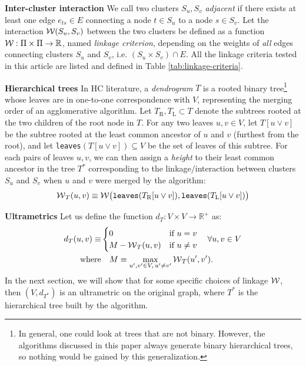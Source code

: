 \textbf{Inter-cluster interaction } We call two clusters $S_u,S_v$ \emph{adjacent} if there exists at least one edge ${e_{ts}\in E}$ connecting a node $t\in S_u$ to a node $s\in S_v$. Let the interaction $\mathcal{W}(S_u,S_v)$ between the two clusters be defined as a function $\mathcal{W}{}:\Pi \times \Pi \rightarrow \mathbb{R}$,  named \emph{linkage criterion}, depending on the weights of \emph{all} edges connecting clusters $S_u$ and $S_v$, i.e. $(S_u \times S_v) \cap E$. 
All the linkage criteria tested in this article are listed and defined in Table \ref{tab:linkage-criteria}.

\textbf{Hierarchical trees} In HC literature, a \emph{dendrogram} $T$ is a rooted binary tree\footnote{In general, one could look at trees that are not binary. However, the algorithms discussed in this paper always generate binary hierarchical trees, so nothing would be gained by this generalization.} whose leaves are in one-to-one correspondence with $V$, representing the merging order of an agglomerative algorithm.
Let $T_{\mathrm{R}},T_{\mathrm{L}}\subset T$ denote the subtrees rooted at the two children of the root node in $T$.
For any two leaves $u,v \in V$, let $T[u \vee v]$ be the subtree rooted at the least common ancestor of $u$ and $v$ (furthest from the root), and let \texttt{leaves}$(T[u \vee v])\subseteq V$ be the set of leaves of this subtree. 
For each pairs of leaves $u,v$, we can then assign a \emph{height} to their least common ancestor in the tree $T^*$ corresponding to the linkage/interaction between clusters $S_u$ and $S_v$ when $u$ and $v$ were merged by the algorithm:
\begin{equation}
\mathcal{W}{}_{T}(u,v) \equiv \mathcal{W}{} \big( \text{\texttt{leaves}}(T_{\mathrm{R}}[u \vee v]), \text{\texttt{leaves}}(T_{\mathrm{L}}[u \vee v]) \big)
\end{equation}


\textbf{Ultrametrics}  Let us define the function $d_T: V \times V \rightarrow \mathbb{R}^{+}$ as:
\begin{align}
d_T(u,v)\equiv &\begin{cases}
0 & \text{if}\,\, u=v\\
M-\mathcal{W}{}_{T}(u,v) & \text{if}\,\, u\neq v
\end{cases}\quad \forall u,v\in V\\
\mathrm{where}& \quad  M \equiv \max_{u',v'\in V,\,u'\neq v'}\mathcal{W}{}_{T}(u',v').
\end{align}
In the next section, we will show that for some specific choices of linkage $\mathcal{W}{}$, then $(V, d_{T^*})$ is an ultrametric on the original graph, where $T^*$ is the hierarchical tree built by the \algname{} algorithm.

